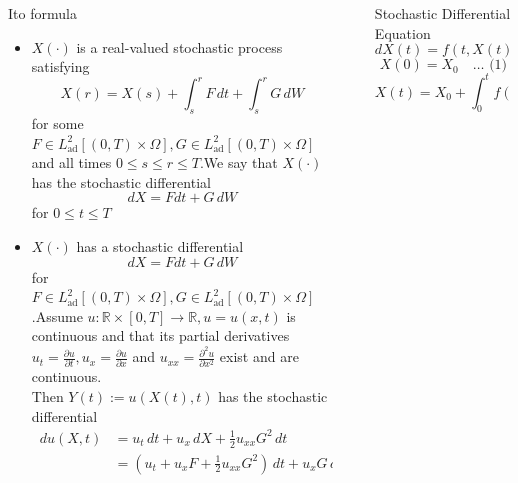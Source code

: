 \documentclass[final]{beamer}
\newlength{\sepwidth}
\newlength{\colwidth}
\newcommand{\separatorcolumn}{\begin{column}{\sepwidth}\end{column}}
\begin{document}
\begin{frame}[t]
\begin{columns}[t]
\begin{column}{\colwidth}
\begin{block}{It$\hat{\text{o}}$ formula}
 \begin{itemize}
     \item $X(\cdot)$ is a real-valued stochastic process satisfying \[ X(r) = X(s) + \int_s^r F\,dt + \int_s^r G\,dW\] for some $F \in L^2_\text{ad}[(0,T)\times \Omega], G \in L^2_\text{ad}[(0,T)\times \Omega]$ and all times $0 \leq  s \leq r \leq T$.We say that $X(\cdot)$ has the stochastic differential 
     \[ dX = F dt + G\,dW\] for $0 \leq t \leq T$
     \item $X(\cdot)$ has a stochastic differential \[ dX = F dt + G\,dW\] for $F \in L^2_\text{ad}[(0,T)\times \Omega], G \in L^2_\text{ad}[(0,T)\times \Omega]$.Assume $u \colon \mathbb{R} \times [0,T] \rightarrow \mathbb{R}, u = u(x,t)$ is continuous and that its partial derivatives $u_t = \frac{\partial u}{\partial t}, u_x = \frac{\partial u}{\partial x}$ and $u_{xx} = \frac{\partial^2 u}{\partial x^2}$  exist and are continuous.\\
     Then $Y(t) := u(X(t),t)$ has the stochastic differential 
     \begin{align*}
         \,du(X,t) &= u_t\,dt + u_x\,dX + \frac{1}{2} u_{xx} G^2\,dt\\
         &= (u_t + u_x F + \frac{1}{2} u_{xx} G^2)\,dt + u_x G\,dW
     \end{align*}
 \end{itemize}





    
\end{block}




\end{column}

\separatorcolumn

\begin{column}{\colwidth}

  \begin{block}{Stochastic Differential Equation}
    \[dX(t) = f(t,X(t))\,dt + \sigma(t,X(t))\,dW_t, \quad t \in (0,T) \]  \[X(0) = X_0 \quad  \dots \text{ (1)} \] 
    \[X(t) = X_0 + \int_0^t f(s,X(s))\,ds + \int_0^t \sigma(s,X(s))\,dW_s \quad \text{almost surely in} \ P.\]
    

\end{block}
\end{column}
\end{columns}
\end{frame}
\end{document}
